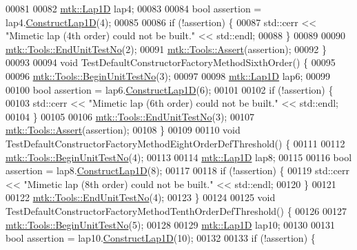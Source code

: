 \begin{DoxyCode}
00081 
00082   \hyperlink{classmtk_1_1Lap1D}{mtk::Lap1D} lap4;
00083 
00084   \textcolor{keywordtype}{bool} assertion = lap4.\hyperlink{classmtk_1_1Lap1D_a685dcba88c08cf5b7b6c2aa4669a472c}{ConstructLap1D}(4);
00085 
00086   \textcolor{keywordflow}{if} (!assertion) \{
00087     std::cerr << \textcolor{stringliteral}{"Mimetic lap (4th order) could not be built."} << std::endl;
00088   \}
00089 
00090   \hyperlink{classmtk_1_1Tools_ad8cf0085133dd40c913fe195bc5b9694}{mtk::Tools::EndUnitTestNo}(2);
00091   \hyperlink{classmtk_1_1Tools_aa311fada9255627d06c56b1e4fedce9e}{mtk::Tools::Assert}(assertion);
00092 \}
00093 
00094 \textcolor{keywordtype}{void} TestDefaultConstructorFactoryMethodSixthOrder() \{
00095 
00096   \hyperlink{classmtk_1_1Tools_a26ee906d28523378522a75e25c3a4e19}{mtk::Tools::BeginUnitTestNo}(3);
00097 
00098   \hyperlink{classmtk_1_1Lap1D}{mtk::Lap1D} lap6;
00099 
00100   \textcolor{keywordtype}{bool} assertion = lap6.\hyperlink{classmtk_1_1Lap1D_a685dcba88c08cf5b7b6c2aa4669a472c}{ConstructLap1D}(6);
00101 
00102   \textcolor{keywordflow}{if} (!assertion) \{
00103     std::cerr << \textcolor{stringliteral}{"Mimetic lap (6th order) could not be built."} << std::endl;
00104   \}
00105 
00106   \hyperlink{classmtk_1_1Tools_ad8cf0085133dd40c913fe195bc5b9694}{mtk::Tools::EndUnitTestNo}(3);
00107   \hyperlink{classmtk_1_1Tools_aa311fada9255627d06c56b1e4fedce9e}{mtk::Tools::Assert}(assertion);
00108 \}
00109 
00110 \textcolor{keywordtype}{void} TestDefaultConstructorFactoryMethodEightOrderDefThreshold() \{
00111 
00112   \hyperlink{classmtk_1_1Tools_a26ee906d28523378522a75e25c3a4e19}{mtk::Tools::BeginUnitTestNo}(4);
00113 
00114   \hyperlink{classmtk_1_1Lap1D}{mtk::Lap1D} lap8;
00115 
00116   \textcolor{keywordtype}{bool} assertion = lap8.\hyperlink{classmtk_1_1Lap1D_a685dcba88c08cf5b7b6c2aa4669a472c}{ConstructLap1D}(8);
00117 
00118   \textcolor{keywordflow}{if} (!assertion) \{
00119     std::cerr << \textcolor{stringliteral}{"Mimetic lap (8th order) could not be built."} << std::endl;
00120   \}
00121 
00122   \hyperlink{classmtk_1_1Tools_ad8cf0085133dd40c913fe195bc5b9694}{mtk::Tools::EndUnitTestNo}(4);
00123 \}
00124 
00125 \textcolor{keywordtype}{void} TestDefaultConstructorFactoryMethodTenthOrderDefThreshold() \{
00126 
00127   \hyperlink{classmtk_1_1Tools_a26ee906d28523378522a75e25c3a4e19}{mtk::Tools::BeginUnitTestNo}(5);
00128 
00129   \hyperlink{classmtk_1_1Lap1D}{mtk::Lap1D} lap10;
00130 
00131   \textcolor{keywordtype}{bool} assertion = lap10.\hyperlink{classmtk_1_1Lap1D_a685dcba88c08cf5b7b6c2aa4669a472c}{ConstructLap1D}(10);
00132 
00133   \textcolor{keywordflow}{if} (!assertion) \{

\end{DoxyCode}
